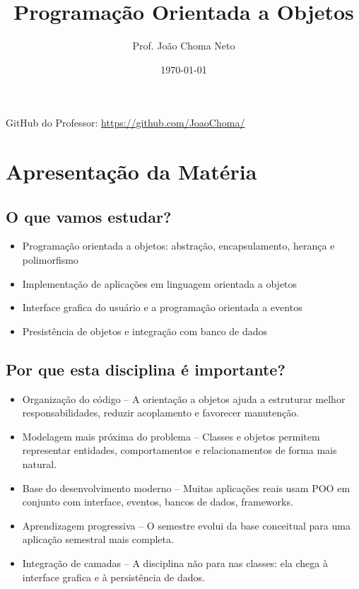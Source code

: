 \documentclass[12pt]{article}
\title{Programação Orientada a Objetos}
\author{Prof. João Choma Neto}
\date{\today}
\begin{document}
\maketitle
GitHub do Professor: \url{https://github.com/JoaoChoma/}

\tableofcontents
{}
\section*{Apresentação da Matéria}
    \subsection{O que vamos estudar?}
    \begin{itemize}
        \item Programação orientada a objetos: abstração, encapsulamento, 
        herança e polimorfismo
        \item Implementação de aplicações em linguagem orientada a objetos
        \item Interface grafica do usuário e a programação orientada a eventos
        \item Presistência de objetos e integração com banco de dados
    \end{itemize}
    \subsection{Por que esta disciplina é importante?}
    \begin{itemize}
        \item Organização do código -- A orientação a objetos ajuda a 
        estruturar melhor responsabilidades, reduzir acoplamento e favorecer 
        manutenção.
        \item Modelagem mais próxima do problema -- Classes e objetos permitem 
        representar entidades, comportamentos e relacionamentos de forma mais 
        natural.
        \item Base do desenvolvimento moderno -- Muitas aplicações reais usam 
        POO em conjunto com interface, eventos, bancos de dados, frameworks.
        \item Aprendizagem progressiva -- O semestre evolui da base conceitual 
        para uma aplicação semestral mais completa.
        \item Integração de camadas -- A disciplina não para nas classes: ela 
        chega à interface grafica e à persistência de dados. 
    \end{itemize}
\end{document}
